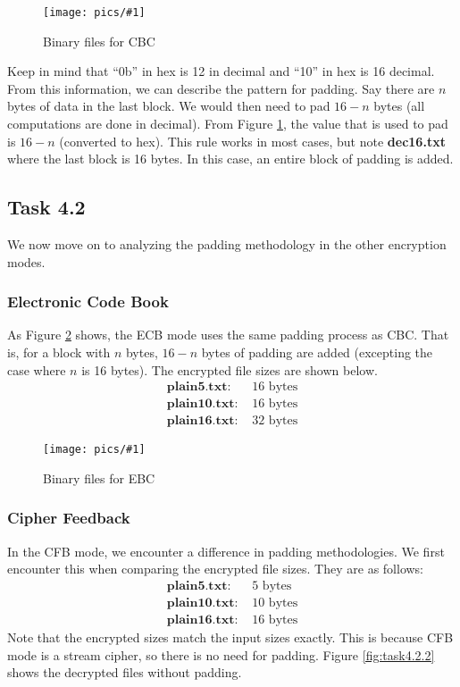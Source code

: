 \documentclass[11pt]{article}
\newcommand{\fig}[2]{ 
\begin{figure}[h]
	\centering
	\caption{#2}
	\texttt{[image: pics/\#1]}
	\label{fig:#1}
\end{figure} 
}
\begin{document}
\fig{task4.1.1}{Binary files for CBC}

Keep in mind that ``0b'' in hex is 12 in decimal and ``10'' in hex is 16 decimal. From this information, we can describe the pattern for padding. Say there are $n$ bytes of data in the last block. We would then need to pad $16-n$ bytes (all computations are done in decimal). From Figure \ref{fig:task4.1.1}, the value that is used to pad is $16-n$ (converted to hex). This rule works in most cases, but note \textbf{dec16.txt} where the last block is 16 bytes. In this case, an entire block of padding is added.


\newpage
\subsection*{Task 4.2}

We now move on to analyzing the padding methodology in the other encryption modes.

\subsubsection*{Electronic Code Book}

As Figure \ref{fig:task4.2.1} shows, the ECB mode uses the same padding process as CBC. That is, for a block with $n$ bytes, $16-n$ bytes of padding are added (excepting the case where $n$ is 16 bytes). The encrypted file sizes are shown below.
\begin{align*}
\textbf{plain5.txt: }  & 16 \text{ bytes} \\
\textbf{plain10.txt: } & 16 \text{ bytes} \\
\textbf{plain16.txt: } & 32 \text{ bytes}
\end{align*}

\fig{task4.2.1}{Binary files for EBC}


\subsubsection*{Cipher Feedback}

In the CFB mode, we encounter a difference in padding methodologies. We first encounter this when comparing the encrypted file sizes. They are as follows:
\begin{align*}
\textbf{plain5.txt: }  & 5 \text{ bytes} \\
\textbf{plain10.txt: } & 10 \text{ bytes} \\
\textbf{plain16.txt: } & 16 \text{ bytes}
\end{align*}
Note that the encrypted sizes match the input sizes exactly. This is because CFB mode is a stream cipher, so there is no need for padding. Figure \ref{fig:task4.2.2} shows the decrypted files without padding.
\end{document}
